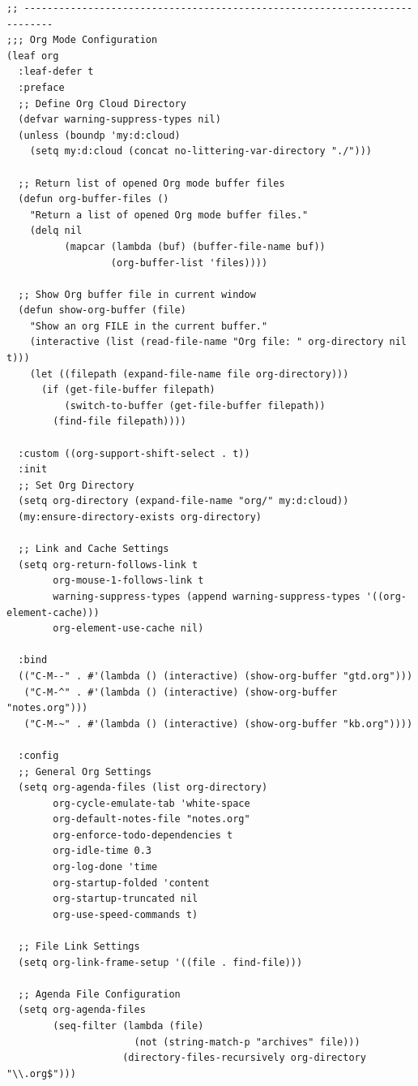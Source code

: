\documentclass[11pt]{article}
\begin{document}
\begin{verbatim}
;; ---------------------------------------------------------------------------
;;; Org Mode Configuration
(leaf org
  :leaf-defer t
  :preface
  ;; Define Org Cloud Directory
  (defvar warning-suppress-types nil)
  (unless (boundp 'my:d:cloud)
    (setq my:d:cloud (concat no-littering-var-directory "./")))

  ;; Return list of opened Org mode buffer files
  (defun org-buffer-files ()
    "Return a list of opened Org mode buffer files."
    (delq nil
          (mapcar (lambda (buf) (buffer-file-name buf))
                  (org-buffer-list 'files))))

  ;; Show Org buffer file in current window
  (defun show-org-buffer (file)
    "Show an org FILE in the current buffer."
    (interactive (list (read-file-name "Org file: " org-directory nil t)))
    (let ((filepath (expand-file-name file org-directory)))
      (if (get-file-buffer filepath)
          (switch-to-buffer (get-file-buffer filepath))
        (find-file filepath))))

  :custom ((org-support-shift-select . t))
  :init
  ;; Set Org Directory
  (setq org-directory (expand-file-name "org/" my:d:cloud))
  (my:ensure-directory-exists org-directory)

  ;; Link and Cache Settings
  (setq org-return-follows-link t
        org-mouse-1-follows-link t
        warning-suppress-types (append warning-suppress-types '((org-element-cache)))
        org-element-use-cache nil)

  :bind
  (("C-M--" . #'(lambda () (interactive) (show-org-buffer "gtd.org")))
   ("C-M-^" . #'(lambda () (interactive) (show-org-buffer "notes.org")))
   ("C-M-~" . #'(lambda () (interactive) (show-org-buffer "kb.org"))))

  :config
  ;; General Org Settings
  (setq org-agenda-files (list org-directory)
        org-cycle-emulate-tab 'white-space
        org-default-notes-file "notes.org"
        org-enforce-todo-dependencies t
        org-idle-time 0.3
        org-log-done 'time
        org-startup-folded 'content
        org-startup-truncated nil
        org-use-speed-commands t)

  ;; File Link Settings
  (setq org-link-frame-setup '((file . find-file)))

  ;; Agenda File Configuration
  (setq org-agenda-files
        (seq-filter (lambda (file)
                      (not (string-match-p "archives" file)))
                    (directory-files-recursively org-directory "\\.org$")))


\end{verbatim}
\end{document}
